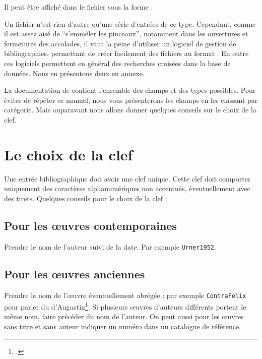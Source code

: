 Il peut être affiché dans le fichier  sous la forme :

\begin{quotation}
\cite{Urner1952}
\end{quotation}



Un fichier  n'est rien d'autre qu'une série d'entrées de ce type. Cependant, comme il est assez aisé de \enquote{s'emmêler les pinceaux}, notamment dans les ouvertures et fermetures des accolades, il vaut la peine d'utiliser un logiciel de gestion de bibliographies, permettant de créer facilement des fichiers au format . En outre ces logiciels permettent en général des recherches croisées dans la base de données. Nous en  présentons deux en annexe.

La documentation de  contient l'ensemble des champs et des types possibles. Pour éviter de répéter ce manuel, nous vous présenterons les champs en les classant par catégorie. Mais auparavant nous allons donner quelques conseils sur le choix de la clef.

\section{Le choix de la clef}

Une entrée bibliographique doit avoir une clef unique. Cette clef doit comporter uniquement des caractères alphanumériques non accentués, éventuellement avec des tirets. 
Quelques conseils pour le choix de la clef :
\subsection{Pour les œuvres contemporaines}
Prendre le nom de l'auteur suivi de la date. Par exemple \verb|Urner1952|.

\subsection{Pour les œuvres anciennes}

Prendre le nom de l'œuvre  éventuellement abrégée : par exemple \verb|ContraFelix| pour parler du  d'Augustin\footcite{ContraFelix}. Si plusieurs œuvres d'auteurs différents portent le même nom, faire précéder du nom de l'auteur. On peut aussi pour les œuvres sans titre et sans auteur indiquer un numéro dans un catalogue de référence.



